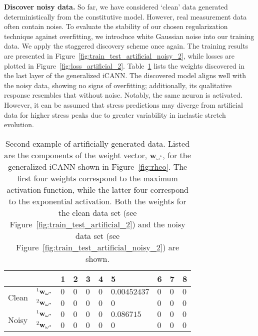 \textbf{Discover noisy data.} So far, we have considered `clean' data generated deterministically from the constitutive model. 
However, real measurement data often contain noise. 
To evaluate the stability of our chosen regularization technique against overfitting, we introduce white Gaussian noise into our training data. 
We apply the staggered discovery scheme once again. 
The training results are presented in Figure~\ref{fig:train_test_artificial_noisy_2}, while losses are plotted in Figure~\ref{fig:loss_artificial_2}. 
Table~\ref{tab:w_pot_artificial_2} lists the weights discovered in the last layer of the generalized iCANN. 
The discovered model aligns well with the noisy data, showing no signs of overfitting; additionally, its qualitative response resembles that without noise. 
Notably, the same neuron is activated. 
However, it can be assumed that stress predictions may diverge from artificial data for higher stress peaks due to greater variability in inelastic stretch evolution.
%
\begin{table}[h]
    \centering
        \begin{tabular}{l l | l l l l l l l l}
                &    &   1   &   2   &   3   &   4   &   5   &   6   &   7   &   8 \\
            \hline
            \multirow{2}{*}{Clean}  & $\prescript{1}{}{}\mathbf{w}_{\omega^*}$ & $0$ & $0$ & $0$ & $0$ & $0.00452437$ & $0$ & $0$ & $0$ \\
                                    & $\prescript{2}{}{}\mathbf{w}_{\omega^*}$ & $0$ & $0$ & $0$ & $0$ & $0$ & $0$ & $0$ & $0$ \\
            \hline
            \multirow{2}{*}{Noisy}  & $\prescript{1}{}{}\mathbf{w}_{\omega^*}$ & $0$ & $0$ & $0$ & $0$ & $0.086715$ & $0$ & $0$ & $0$ \\
                                    & $\prescript{2}{}{}\mathbf{w}_{\omega^*}$ & $0$ & $0$ & $0$ & $0$ & $0$ & $0$ & $0$ & $0$                                    
        \end{tabular}
    \caption{Second example of artificially generated data. Listed are the components of the weight vector, $\mathbf{w}_{\omega^*}$, for the generalized iCANN shown in Figure~\ref{fig:rheo}. The first four weights correspond to the maximum activation function, while the latter four correspond to the exponential activation. Both the weights for the clean data set (see Figure~\ref{fig:train_test_artificial_2}) and the noisy data set (see Figure~\ref{fig:train_test_artificial_noisy_2}) are shown.}
    \label{tab:w_pot_artificial_2}
\end{table}

